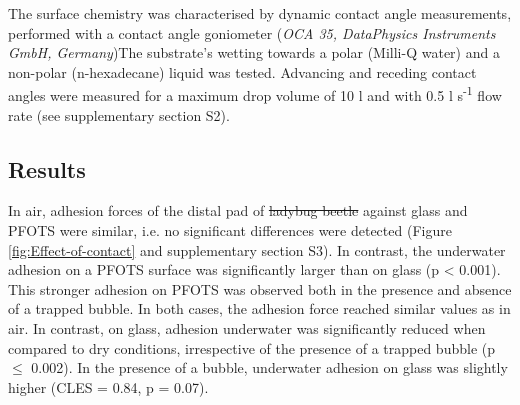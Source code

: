 \documentclass[vruler,JEB]{COB}%
\providecommand{\DIFadd}[1]{{\protect\color{blue}\uwave{#1}}} %
\providecommand{\DIFdel}[1]{{\protect\color{red}\sout{#1}}}                      %
\providecommand{\DIFaddbegin}{} %
\providecommand{\DIFaddend}{} %
\providecommand{\DIFdelbegin}{} %
\providecommand{\DIFdelend}{} %
\begin{document}
The surface chemistry was characterised by dynamic contact angle
measurements, performed with a contact angle goniometer (\emph{OCA 35, DataPhysics Instruments GmbH, Germany})\DIFaddbegin \DIFadd{.
}\DIFaddend The substrate's wetting towards a polar (Milli-Q water) and a non-polar (n-hexadecane) liquid was tested. Advancing
and receding contact angles were measured for a maximum drop volume
of 10 \textmu l and with 0.5 \textmu l s\protect\textsuperscript{-1} flow rate (see supplementary section S2).

\subsection{Results}


In air, adhesion forces of the distal pad of \DIFdelbegin \DIFdel{ladybug beetle }\DIFdelend \DIFaddbegin \DIFadd{the ladybug beetles }\DIFaddend against
glass and PFOTS were similar, i.e. no significant differences were
detected (Figure \ref{fig:Effect-of-contact} and supplementary section S3).
In contrast, the underwater adhesion on a PFOTS surface was significantly
larger than on glass (p < 0.001). This stronger adhesion on PFOTS
was observed both in the presence and absence of a trapped bubble.
In both cases, the adhesion force reached similar values as in air. In contrast,
on glass, adhesion underwater was significantly reduced when compared
to dry conditions, irrespective of the presence of a trapped bubble
(p $\leq$ 0.002). In the presence of a bubble, underwater adhesion on glass was slightly higher (CLES = 0.84, p = 0.07).
\end{document}
